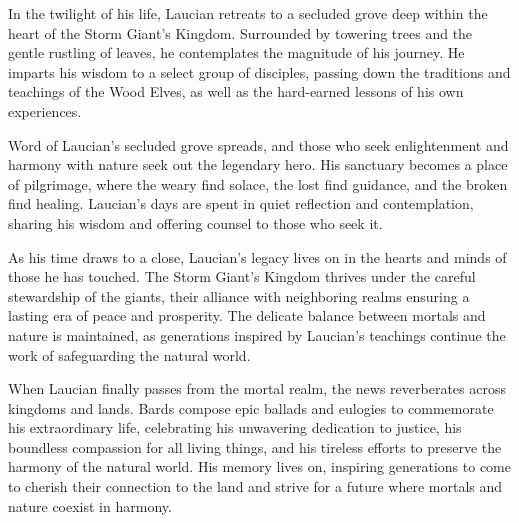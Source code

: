\documentclass[letterpaper,openany,oneside,twocolumn]{book}
\begin{document}
In the twilight of his life, Laucian retreats to a secluded grove deep within the heart of the Storm Giant's Kingdom. Surrounded by towering trees and the gentle rustling of leaves, he contemplates the magnitude of his journey. He imparts his wisdom to a select group of disciples, passing down the traditions and teachings of the Wood Elves, as well as the hard-earned lessons of his own experiences.

Word of Laucian's secluded grove spreads, and those who seek enlightenment and harmony with nature seek out the legendary hero. His sanctuary becomes a place of pilgrimage, where the weary find solace, the lost find guidance, and the broken find healing. Laucian's days are spent in quiet reflection and contemplation, sharing his wisdom and offering counsel to those who seek it.

As his time draws to a close, Laucian's legacy lives on in the hearts and minds of those he has touched. The Storm Giant's Kingdom thrives under the careful stewardship of the giants, their alliance with neighboring realms ensuring a lasting era of peace and prosperity. The delicate balance between mortals and nature is maintained, as generations inspired by Laucian's teachings continue the work of safeguarding the natural world.

When Laucian finally passes from the mortal realm, the news reverberates across kingdoms and lands. Bards compose epic ballads and eulogies to commemorate his extraordinary life, celebrating his unwavering dedication to justice, his boundless compassion for all living things, and his tireless efforts to preserve the harmony of the natural world. His memory lives on, inspiring generations to come to cherish their connection to the land and strive for a future where mortals and nature coexist in harmony.
\end{document}
